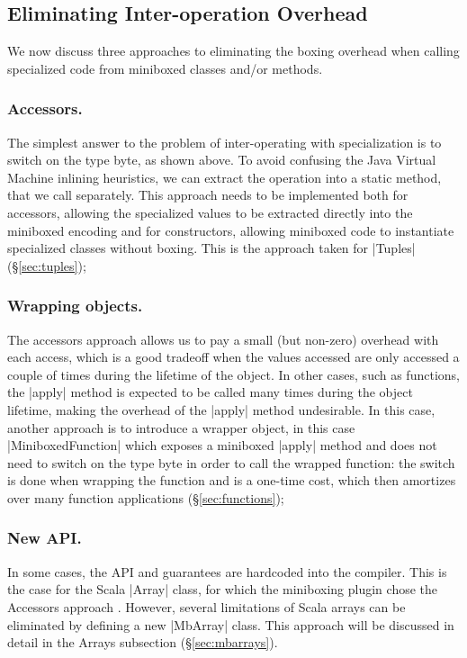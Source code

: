 \subsection{Eliminating Inter-operation Overhead}

We now discuss three approaches to eliminating the boxing overhead when calling specialized code from miniboxed classes and/or methods.

\subsubsection{Accessors.} The simplest answer to the problem of inter-operating with specialization is to switch on the type byte, as shown above. To avoid confusing the Java Virtual Machine inlining heuristics, we can extract the operation into a static method, that we call separately. This approach needs to be implemented both for accessors, allowing the specialized values to be extracted directly into the miniboxed encoding and for constructors, allowing miniboxed code to instantiate specialized classes without boxing. This is the approach taken for |Tuples| (\S\ref{sec:tuples});

\subsubsection{Wrapping objects.} The accessors approach allows us to pay a small (but non-zero) overhead with each access, which is a good tradeoff when the values accessed are only accessed a couple of times during the lifetime of the object. In other cases, such as functions, the |apply| method is expected to be called many times during the object lifetime, making the overhead of the |apply| method undesirable. In this case, another approach is to introduce a wrapper object, in this case |MiniboxedFunction| which exposes a miniboxed |apply| method and does not need to switch on the type byte in order to call the wrapped function: the switch is done when wrapping the function and is a one-time cost, which then amortizes over many function applications (\S\ref{sec:functions});

\subsubsection{New API.} In some cases, the API and guarantees are hardcoded into the compiler. This is the case for the Scala |Array| class, for which the miniboxing plugin chose the Accessors approach \cite{miniboxing}. However, several limitations of Scala arrays can be eliminated by defining a new |MbArray| class. This approach will be discussed in detail in the Arrays subsection (\S\ref{sec:mbarrays}).

